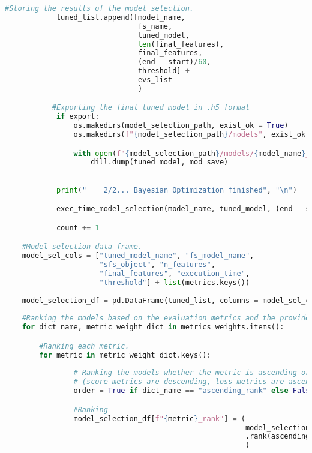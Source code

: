 \begin{lstlisting}[language=Python, basicstyle=\footnotesize\ttfamily]
            #Storing the results of the model selection.
            tuned_list.append([model_name,
                               fs_name,
                               tuned_model,
                               len(final_features),
                               final_features,
                               (end - start)/60,
                               threshold] + 
                               evs_list
                               )

           #Exporting the final tuned model in .h5 format 
            if export:
                os.makedirs(model_selection_path, exist_ok = True)
                os.makedirs(f"{model_selection_path}/models", exist_ok = True)

                with open(f"{model_selection_path}/models/{model_name}_with_{fs_name}.h5", "wb") as mod_save:
                    dill.dump(tuned_model, mod_save)

            
            print("    2/2... Bayesian Optimization finished", "\n")

            exec_time_model_selection(model_name, tuned_model, (end - start)/60, evs_list, threshold, dashes)

            count += 1

    #Model selection data frame.
    model_sel_cols = ["tuned_model_name", "fs_model_name",
                      "sfs_object", "n_features",
                      "final_features", "execution_time",
                      "threshold"] + list(metrics.keys())
    
    model_selection_df = pd.DataFrame(tuned_list, columns = model_sel_cols)
            
    #Ranking the models based on the evaluation metrics and the provided weights.
    for dict_name, metric_weight_dict in metrics_weights.items():

        #Ranking each metric.
        for metric in metric_weight_dict.keys():
                
                # Ranking the models whether the metric is ascending or descending
                # (score metrics are descending, loss metrics are ascending).
                order = True if dict_name == "ascending_rank" else False

                #Ranking
                model_selection_df[f"{metric}_rank"] = (
                                                        model_selection_df[[metric]]
                                                        .rank(ascending = order)
                                                        )
    

\end{lstlisting}
